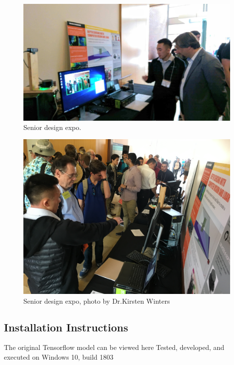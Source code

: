 \documentclass[onecolumn, draftclsnofoot,10pt, compsoc]{IEEEtran}
\makeatletter
\newcommand\captionof[1]{\def\@captype{#1}\caption}
\makeatother
\begin{document}
\begin{singlespace}
		\begin{figure}[H]
		\includegraphics[scale=0.15]{expo1.jpg}
		\captionof{figure}{Senior design expo.}
		\label{expo1}
		\end{figure}

		\begin{figure}[H]
		\includegraphics[scale=0.1]{expo2.jpg}
		\captionof{figure}{Senior design expo, photo by Dr.Kirsten Winters}
		\label{expo2}
		\end{figure}

	\subsection{Installation Instructions}
		The original Tensorflow model can be viewed here 
		Tested, developed, and executed on Windows 10, build 1803


\end{singlespace}
\end{document}
